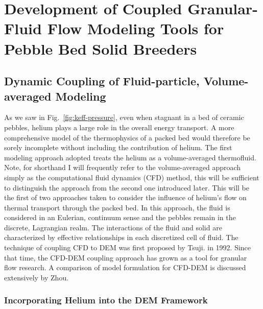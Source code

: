 \chapter{Development of Coupled Granular-Fluid Flow Modeling Tools for Pebble Bed Solid Breeders}\label{ch:cfd-dem-modeling-development}
%
%
\section{Dynamic Coupling of Fluid-particle, Volume-averaged Modeling} \label{sec:modeling-cfd-dem}

As we saw in Fig.~\ref{fig:keff-pressure}, even when stagnant in a bed of ceramic pebbles, helium plays a large role in the overall energy transport. A more comprehensive model of the thermophysics of a packed bed would therefore be sorely incomplete without including the contribution of helium. The first modeling approach adopted treats the helium as a volume-averaged thermofluid. Note, for shorthand I will frequently refer to the volume-averaged approach simply as the computational fluid dynamics (CFD) method, this will be sufficient to distinguish the approach from the second one introduced later. This will be the first of two approaches taken to consider the influence of helium's flow on thermal transport through the packed bed. In this approach, the fluid is considered in an Eulerian, continuum sense and the pebbles remain in the discrete, Lagrangian realm. The interactions of the fluid and solid are characterized by effective relationships in each discretized cell of fluid. The technique of coupling CFD to DEM was first proposed by Tsuji\etal.\cite{Tsuji1992} in 1992. Since that time, the CFD-DEM coupling approach has grown as a tool for granular flow research. A comparison of model formulation for CFD-DEM is discussed extensively by Zhou\etal\cite{Zhou2010}.






\subsection{Incorporating Helium into the DEM Framework}\label{sec:cfdem-heat-transfer}

